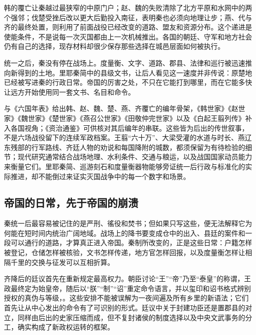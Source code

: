 \begin{causalchain}[统一战争的递进]
韩的覆亡让秦越过最狭窄的中原门户；赵、魏的失败清除了北方平原和水网中的两个强邻；伐楚受挫后改以更大后勤投入南征，表明秦也必须向地理让步；燕、代与齐的最终处置，则利用了前面战役已经改变的道路、盟友和资源分布。这个递进是使能条件，不是说每一次灭国都由上一次机械推出。各国的朝廷、守军和地方社会仍有自己的选择，现存材料却很少保存那些选择在城邑层面如何被执行。
\end{causalchain}

统一之后，秦没有停在战场上。度量衡、文字、道路、郡县、法律和巡行被迅速推向新得到的土地。里耶秦简中的县级文书，让后人看见这一速度并非传说：原楚地已经被写进秦的行政日常。帝国的厉害之处，不只在它能打到哪里，而在它能多快让远方开始使用同一套文书、名目和命令。



\begin{sourcenote}[统一不是单一人物的一步棋]
与《六国年表》给出韩、赵、魏、楚、燕、齐覆亡的编年骨架，《韩世家》《赵世家》《魏世家》《楚世家》《燕召公世家》《田敬仲完世家》以及《白起王翦列传》补入各国视角；《资治通鉴》可供核对其后编年的串联。这些皆为后出的传世叙事，不是六场战役留下的连续军政档案。王翦“六十万”、大梁受灌的水道与时长、燕辽东残部的行军路线、齐廷人物的劝说和每国降附的城数，都须保留为有待检验的细节；现代研究通常结合战场地理、水利条件、交通与粮运，以及战国国家动员能力来衡量它们。里耶秦简、巡游刻石和度量衡器物能够旁证统一后行政与标准化的实际推进，却不能倒过来证实灭国战争中的每一个数字和场景。
\end{sourcenote}



\subsection{帝国的日常，先于帝国的崩溃}

秦统一后最容易被记住的是严刑、徭役和焚书；但如果只写这些，便无法解释它为何能在短时间内统治广阔地域。战场上的降书要变成仓中的出入、县廷的案件和一段可以通行的道路，才算真正进入帝国。秦制所改变的，正是这些日常：户籍怎样被登记，仓储怎样被核验，文书怎样传递，地方官怎样回报，以及度量衡怎样让相隔千里的交换与征发可以互相折算。

齐降后的廷议首先在重新规定最高权力。朝臣讨论“王”“帝”乃至“泰皇”的称谓，王政最终定为始皇帝，随后以“朕”“制”“诏”重定命令语言，并以玺印和诏书格式辨别授权的真伪与等级，。这些安排不能被误解为一夜间遍及所有乡里的新语法；它们首先让从中心发出的命令有了可识别的形式。廷议中关于封建功臣还是置郡县的对立，同样由后出的史家压缩而成，但不复封诸侯的制度选择以及中央文武事务的分工，确实构成了新政权运转的框架。

